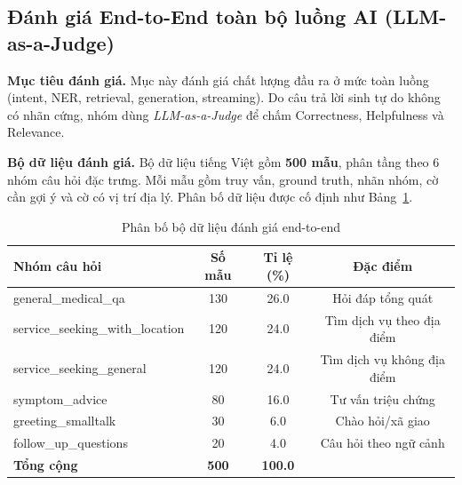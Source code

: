 
\subsection{Đánh giá End-to-End toàn bộ luồng AI (LLM-as-a-Judge)}

\textbf{Mục tiêu đánh giá.}
Mục này đánh giá chất lượng đầu ra ở mức toàn luồng (intent, NER, retrieval, generation, streaming). Do câu trả lời sinh tự do không có nhãn cứng, nhóm dùng \textit{LLM-as-a-Judge} để chấm Correctness, Helpfulness và Relevance.

\textbf{Bộ dữ liệu đánh giá.}
Bộ dữ liệu tiếng Việt gồm \textbf{500 mẫu}, phân tầng theo 6 nhóm câu hỏi đặc trưng. Mỗi mẫu gồm truy vấn, ground truth, nhãn nhóm, cờ cần gợi ý và cờ có vị trí địa lý. Phân bố dữ liệu được cố định như Bảng~\ref{tab:e2e_dataset_dist}.

\begin{table}[H]
\centering
\begin{tabular}{|l|c|c|c|}
\hline
\textbf{Nhóm câu hỏi} & \textbf{Số mẫu} & \textbf{Tỉ lệ (\%)} & \textbf{Đặc điểm} \\
\hline
general\_medical\_qa            & 130 & 26.0 & Hỏi đáp tổng quát \\
\hline
service\_seeking\_with\_location & 120 & 24.0 & Tìm dịch vụ theo địa điểm \\
\hline
service\_seeking\_general        & 120 & 24.0 & Tìm dịch vụ không địa điểm \\
\hline
symptom\_advice                  & 80  & 16.0 & Tư vấn triệu chứng \\
\hline
greeting\_smalltalk              & 30  & 6.0  & Chào hỏi/xã giao \\
\hline
follow\_up\_questions            & 20  & 4.0  & Câu hỏi theo ngữ cảnh \\
\hline
\textbf{Tổng cộng}               & \textbf{500} & \textbf{100.0} & \\
\hline
\end{tabular}
\caption{Phân bố bộ dữ liệu đánh giá end-to-end}
\label{tab:e2e_dataset_dist}
\end{table}

